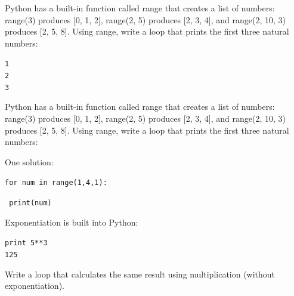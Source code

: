 \documentclass{beamer}
\begin{document}
\begin{frame}{ }

Python has a built-in function called range that creates a list of numbers: range(3) produces [0, 1, 2], range(2, 5) produces [2, 3, 4], and range(2, 10, 3) produces [2, 5, 8]. Using range, write a loop that prints the first three natural numbers:

\vspace{0.5cm}

\begin{beamerboxesrounded}[upper=uppercolgreen,lower=lowercolgreen,shadow=false]{}
\texttt{1\\
2\\
3}
\end{beamerboxesrounded}

\end{frame}


\begin{frame}{ }

Python has a built-in function called range that creates a list of numbers: range(3) produces [0, 1, 2], range(2, 5) produces [2, 3, 4], and range(2, 10, 3) produces [2, 5, 8]. Using range, write a loop that prints the first three natural numbers:

\vspace{0.5cm}

\alert{One solution:}

\texttt{for num in range(1,4,1):}

\texttt{      print(num)}
    

\end{frame}



\begin{frame}{ }

Exponentiation is built into Python:

\vspace{0.5cm}

\begin{beamerboxesrounded}[upper=uppercolgreen,lower=lowercolgreen,shadow=false]{}

\texttt{print 5**3\\
125}
\end{beamerboxesrounded}

\vspace{0.5cm}

Write a loop that calculates the same result using multiplication (without exponentiation).
\end{frame}
\end{document}
